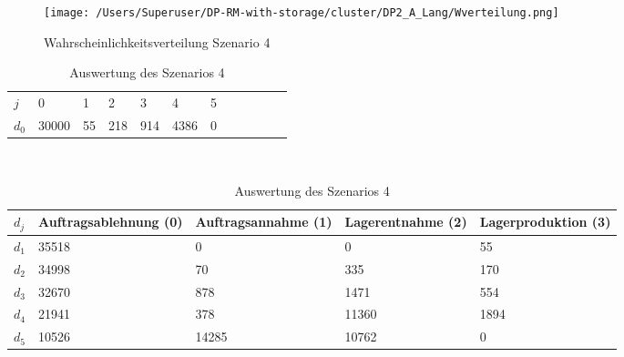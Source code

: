 \begin{figure}[h!]
  \begin{center}
    \texttt{[image: /Users/Superuser/DP-RM-with-storage/cluster/DP2\_A\_Lang/Wverteilung.png]}
    \caption{Wahrscheinlichkeitsverteilung Szenario 4}  \label{SB4}
  \end{center}
\end{figure}

\begin{table}[h!]
\renewcommand{\arraystretch}{1.5}
  \begin{center}
    \caption{Auswertung des Szenarios 4}  \label{AS4}
    \vspace*{3mm}
    \begin{tabular}{l l l l l l l l l l l l }  \hline 
         $j$ & 0 & 1  & 2 & 3 & 4  & 5   \\  
$d_{0}$ &  30000 &  55 &  218 &  914 &  4386 &  0 \\
\hline
    \end{tabular} \\[3mm]
        \begin{tabular}{ l p{2.5cm} p{2.5cm} p{2.5cm} p{2.5cm} }   \hline    %
    $d_j$ & Auftrags\-ablehnung (0) & Auftrags\-annahme (1)  & Lager\-entnahme (2) & Lager\-produktion (3)\\\hline 
$d_1$ &  35518 &    0 &    0 &    55 \\
$d_2$ &  34998 &     70 &    335 &   170 \\
$d_3$ &  32670 &    878 &   1471 &   554 \\
$d_4$ &  21941 &    378 &  11360 &  1894 \\
$d_5$ &  10526 &  14285 &  10762 &   0 \\
          \hline
   \end{tabular} \\[3mm]
     \end{center}
\end{table}


